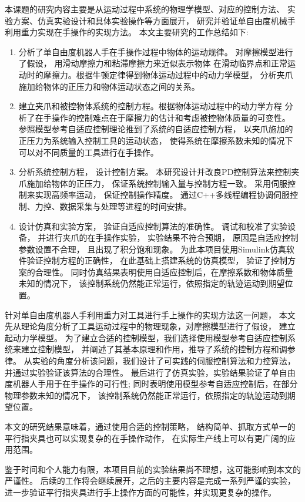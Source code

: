 
\begin{conclusion}
本课题的研究内容主要是从运动过程中系统的物理学模型、对应的控制方法、
实验方案、仿真实验设计和具体实验操作等方面展开，
研究并验证单自由度机械手利用重力实现在手操作的实现方法。
本文主要研究的工作总结如下:

\begin{enumerate}
  \item 分析了单自由度机器人手在手操作过程中物体的运动规律。
    对摩擦模型进行了假设， 用滑动摩擦力和粘滞摩擦力来近似表示物体
    在滑动临界点和正常运动时的摩擦力。根据牛顿定律得到物体运动过程中的动力学模型，
    分析夹爪施加给物体的正压力和物体运动状态之间的关系。
  \item 建立夹爪和被控物体系统的控制方程。根据物体运动过程中的动力学方程
    分析了在手操作的控制难点在于摩擦力的估计和考虑被控物体质量的可变性。
    参照模型参考自适应控制理论推到了系统的自适应控制方程，
    以夹爪施加的正压力为系统输入控制工具的运动状态，
    使得系统在摩擦系数未知的情况下可以对不同质量的工具进行在手操作。
  \item 分析系统控制方程， 设计控制方案。
    本研究设计并改良PD控制算法来控制夹爪施加给物体的正压力，
    保证系统控制输入量与控制方程一致。
    采用伺服控制来实现高频率运动， 保证控制操作精度。
    通过C++多线程编程协调伺服控制、力控、数据采集与处理等进程的时间安排。
  \item 设计仿真和实验方案， 验证自适应控制算法的准确性。
    调试和校准了实验设备， 并进行夹爪的在手操作实验， 实验结果不符合预期，
    原因是自适应控制参数设置不合理， 且出现了积分饱和现象。
    为此本项目使用Simulink仿真软件验证控制方程的正确性， 在此基础上搭建系统的仿真模型，
    验证了控制方案的合理性。
    同时仿真结果表明使用自适应控制后，在摩擦系数和物体质量未知的情况下，
    该控制系统仍然能正常运行，依照指定的轨迹运动到期望位置。
\end{enumerate}

针对单自由度机器人手利用重力对工具进行手上操作的实现方法这一问题，
本文先从理论角度分析了工具运动过程中的物理现象，对摩擦模型进行了假设，
建立起动力学模型。
为了建立合适的控制模型，我们选择使用模型参考自适应控制系统来建立控制模型，
并阐述了其基本原理和作用，推导了系统的控制方程和调参律。
从实验的角度分析该问题，我们设计了可实践的伺服控制算法和力控算法，
并通过实验验证该算法的合理性。
最后进行了仿真实验，实验结果验证了单自由度机器人手用于在手操作的可行性;
同时表明使用模型参考自适应控制后，在部分物理参数未知的情况下，
该控制系统仍然能正常运行，依照指定的轨迹运动到期望位置。

本文的研究结果意味着，通过使用合适的控制策略，
结构简单、抓取方式单一的平行指夹具也可以实现复杂的在手操作动作，
在实际生产线上可以有更广阔的应用范围。

鉴于时间和个人能力有限，本项目目前的实验结果尚不理想，这可能影响到本文的严谨性。
后续的工作将会继续展开，之后的主要内容是完成一系列严谨的实验，
进一步验证平行指夹具进行手上操作方面的可能性，并实现更复杂的操作。

\end{conclusion}
